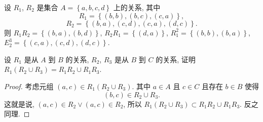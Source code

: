 \documentclass[10pt,UTF8]{book} %
\begin{document}
\begin{exercise}
    设 $R_1$, $R_2$ 是集合 $A = \left\{
        a,b,c,d
    \right\}$ 上的关系, 其中
    \[ R_1 = \left\{
        (b,b), (b,c), (c,a)
    \right\}, \]
    \[ R_2 = \left\{
        (b,a), (c,d), (c,a), (d,c)
    \right\}. \]
    则 $R_1R_2 = \left\{
        (b,a), (b,d)
    \right\}$, $R_2R_1 = \left\{
        (d,a)
    \right\}$, $R_1^2 = \left\{
        (b,b), (b,a)
    \right\}$,
    $E_2^3 = \left\{
        (c,a), (c,d), (d,c)
    \right\}$.
\end{exercise}

\begin{exercise}
    设 $R_1$ 是从 $A$ 到 $B$ 的关系,
    $R_2$, $R_3$ 是从 $B$ 到 $C$ 的关系, 证明 $R_1 \left( R_2 \cup R_3 \right)
    = R_1R_2 \cup R_1R_3$.
    \begin{proof}
        考虑元组 $(a,c) \in R_1 \left(
            R_2 \cup R_3
        \right)$. 其中 $a \in A$ 且 $c \in C$ 且存在 $b \in B$ 使得
        \[ (b,c) \in R_2 \cup R_3. \]
        这就是说, $(a,c) \in R_2 \vee (a,c) \in R_2$, 所以 $R_1 \left(
            R_2 \cup R_3
        \right) \subset R_1R_2 \cup R_1R_3$.
        反之同理.
    \end{proof}
\end{exercise}
\end{document}

